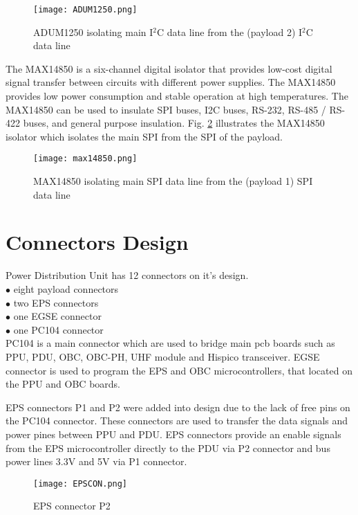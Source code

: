  \begin{figure}[h]
 	\centering
 	\texttt{[image: ADUM1250.png]}
 	\caption{ADUM1250 isolating main I$^2$C data line from the (payload 2) I$^2$C data line }
 	\label{fig: adum}
 \end{figure} 

\cite{31} The MAX14850 is a six-channel digital isolator that provides low-cost digital signal transfer between circuits with different power supplies. The MAX14850 provides low power consumption and stable operation at high temperatures. The MAX14850 can be used to insulate SPI buses, I2C buses, RS-232, RS-485 / RS-422 buses, and general purpose insulation. Fig. \ref{fig: adum122} illustrates the MAX14850 isolator which isolates the main SPI from the SPI of the payload.

\begin{figure}[h]
	\centering
	\texttt{[image: max14850.png]}
	\caption{MAX14850 isolating main SPI data line from the (payload 1) SPI data line }
	\label{fig: adum122}
\end{figure} 

\section{Connectors Design}

Power Distribution Unit has 12 connectors on it's design. \\

$\bullet$ eight payload connectors\\
$\bullet$ two EPS connectors\\
$\bullet$ one EGSE connector\\
$\bullet$ one PC104 connector\\

PC104 is a main connector which are used to bridge main pcb boards such as PPU, PDU, OBC, OBC-PH, UHF module and Hispico transceiver.
EGSE connector is used to program the EPS and OBC microcontrollers, that located on the PPU and OBC boards.

EPS connectors P1 and P2 were added into design due to the lack of free pins on the PC104 connector. These connectors are used to transfer the data signals and power pines between PPU and PDU. EPS connectors provide an enable signals from the EPS microcontroller directly to the PDU via P2 connector and bus power lines 3.3V and 5V via P1 connector.

  \begin{figure}[h]
  	\centering
  	\texttt{[image: EPSCON.png]}
  	\caption{EPS connector P2}
  	\label{fig: EPSCON}
  \end{figure} 

